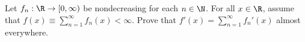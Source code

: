 Let $f_n:\R\rightarrow [0,\infty)$ be nondecreasing for each $n\in
\N$. For all $x\in \R$, assume that $f(x)\equiv
\sum_{n=1}^{\infty}f_n(x)<\infty$. Prove that
$f'(x)=\sum_{n=1}^{\infty}f_n'(x)$ almost everywhere.
